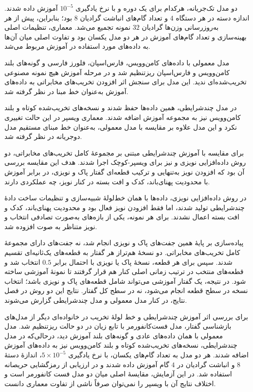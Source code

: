 دو مدل تک‌جریانه، هرکدام برای یک دوره و با نرخ یادگیری $10^{-5}$ آموزش داده شدند. اندازه دسته در هر دستگاه $4$ و تعداد گام‌های انباشت گرادیان $8$ بود؛ بنابراین، پیش از هر به‌روزرسانی وزن‌ها گرادیان $32$ نمونه تجمیع می‌شد. معماری، تنظیمات اصلی بهینه‌سازی و تعداد گام‌های آموزش در هر دو مدل یکسان بود و تفاوت اصلی میان آن‌ها به داده‌های مورد استفاده در آموزش مربوط می‌شد.

مدل معمولی با داده‌های کامن‌وویس، فارس‌اسپان، فلورز فارسی و گونه‌های بلند کامن‌وویس و فارس‌اسپان ریزتنظیم شد و در مرحله آموزش هیچ نمونه مصنوعی تخریب‌شده‌ای ندید. این مدل برای سنجش اثر افزودن تخریب‌های مخابراتی به داده‌های آموزش به‌عنوان خط مبنا در نظر گرفته شد.

در مدل چندشرایطی، همین داده‌ها حفظ شدند و نسخه‌های تخریب‌شده کوتاه و بلند کامن‌وویس نیز به مجموعه آموزش اضافه شدند. معماری ویسپر در این حالت تغییری نکرد و این مدل علاوه بر مقایسه با مدل معمولی، به‌عنوان خط مبنای مستقیم مدل دوجریانه در نظر گرفته شد.


برای مقایسه با آموزش چندشرایطی مبتنی بر مجموعهٔ کامل تخریب‌های مخابراتی، دو روش داده‌افزایی نویزی و   نیز برای ویسپر-کوچک اجرا شدند. هدف این مقایسه بررسی آن بود که افزودن نویز به‌تنهایی و ترکیب قطعه‌ای گفتار پاک و نویزی، در برابر آموزش با محدودیت پهنای‌باند، کدک و افت بسته در کنار نویز، چه عملکردی دارند.

در روش داده‌افزایی نویزی، داده‌ها با همان خط‌لولهٔ شبیه‌سازی و تنظیمات ساخت دادهٔ چندشرایطی تولید شدند، اما فقط افزودن نویز فعال بود و محدودیت پهنای‌باند، کدک و افت بسته اعمال نشدند. برای هر نمونه، یکی از بازه‌های  به‌صورت تصادفی انتخاب و نویز متناظر به صوت افزوده شد.

پیاده‌سازی  بر پایهٔ همین جفت‌های پاک و نویزی انجام شد، نه جفت‌های دارای مجموعهٔ کامل تخریب‌های مخابراتی. دو نسخهٔ هم‌تراز هر گفتار به قطعه‌های یک‌ثانیه‌ای تقسیم شدند. سپس برای هر قطعه، نسخهٔ پاک یا نویزی با احتمال برابر $0.5$ انتخاب شد و قطعه‌های منتخب در ترتیب زمانی اصلی کنار هم قرار گرفتند تا نمونهٔ آموزشی ساخته شود. در نتیجه، یک گفتار آموزشی می‌تواند شامل قطعه‌های پاک و نویزی باشد؛ انتخاب نسخه در سطح قطعه انجام می‌شود، نه در سطح کل گفتار. نتایج این دو روش در فصل نتایج، در کنار مدل معمولی و مدل چندشرایطی گزارش می‌شوند.


برای بررسی اثر آموزش چندشرایطی و خط لولهٔ تخریب در خانواده‌ای دیگر از مدل‌های بازشناسی گفتار، مدل فست‌کانفورمر با تابع زیان  در دو حالت ریزتنظیم شد. مدل معمولی با همان داده‌های عادی و گونه‌های بلند آموزش دید، درحالی‌که در مدل چندشرایطی، نسخه‌های تخریب‌شده کوتاه و بلند کامن‌وویس نیز به داده‌های آموزش اضافه شدند. هر دو مدل به تعداد گام‌های یکسان، با نرخ یادگیری $5\times10^{-5}$، اندازهٔ دستهٔ $8$ و انباشت گرادیان در $4$ گام آموزش داده شدند و در ارزیابی از رمزگشایی حریصانه استفاده شد. در این آزمایش، مقایسهٔ اصلی میان دو مدل فست کانفورمر است و اختلاف نتایج آن با ویسپر را نمی‌توان صرفاً ناشی از تفاوت معماری دانست.

